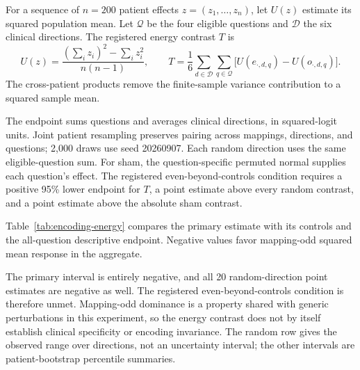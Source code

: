 \begin{samepage}
For a sequence of $n=200$ patient effects $z=(z_1,\ldots,z_n)$, let
$U(z)$ estimate its squared population mean. Let $\mathcal Q$ be the four
eligible questions and $\mathcal D$ the six clinical directions. The
registered energy contrast $T$ is
\begin{equation}
U(z)=\frac{(\sum_i z_i)^2-\sum_i z_i^2}{n(n-1)},\qquad
T=\frac{1}{6}\sum_{d\in\mathcal D}\sum_{q\in\mathcal Q}
\bigl[U(e_{\cdot,d,q})-U(o_{\cdot,d,q})\bigr].
\label{eq:encoding-energy}
\end{equation}
The cross-patient products remove the finite-sample variance contribution
to a squared sample mean.
\end{samepage}
The endpoint sums questions and averages clinical
directions, in squared-logit units. Joint patient resampling preserves
pairing across mappings, directions, and questions; 2,000 draws use seed
20260907. Each random direction uses the same eligible-question sum.
For sham, the question-specific permuted normal supplies each question's
effect. The registered even-beyond-controls condition requires a positive
95\% lower endpoint for $T$, a point estimate above every random contrast,
and a point estimate above the absolute sham contrast.

Table~\ref{tab:encoding-energy} compares the primary estimate with its
controls and the all-question descriptive endpoint. Negative values favor
mapping-odd squared mean response in the aggregate.

\begin{table}[H]
\centering
\caption{Mapping-even versus mapping-odd response energy.}
\label{tab:encoding-energy}
\end{table}

The primary interval is entirely negative, and all 20 random-direction
point estimates are negative as well. The registered even-beyond-controls
condition is therefore unmet. Mapping-odd dominance is a property shared
with generic perturbations in this experiment, so the energy contrast does
not by itself establish clinical specificity or encoding invariance. The
random row gives the observed range over directions, not an uncertainty
interval; the other intervals are patient-bootstrap percentile summaries.

